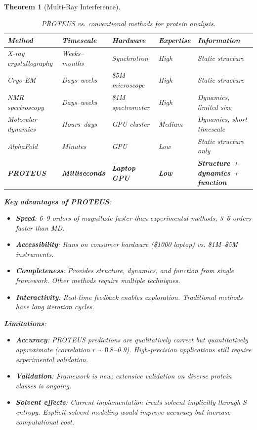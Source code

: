\documentclass[11pt,a4paper]{article}
\newtheorem{theorem}{Theorem}[section]
\begin{document}
\begin{theorem}[Multi-Ray Interference]
\begin{table}[H]
\centering
\caption{PROTEUS vs. conventional methods for protein analysis.}
\small
\begin{tabular}{p{3cm}p{2.5cm}p{2.5cm}p{2.5cm}p{2.5cm}}
\hline
\textbf{Method} & \textbf{Timescale} & \textbf{Hardware} & \textbf{Expertise} & \textbf{Information} \\
\hline
X-ray crystallography & Weeks--months & Synchrotron & High & Static structure \\
Cryo-EM & Days--weeks & \$5M microscope & High & Static structure \\
NMR spectroscopy & Days--weeks & \$1M spectrometer & High & Dynamics, limited size \\
Molecular dynamics & Hours--days & GPU cluster & Medium & Dynamics, short timescale \\
AlphaFold & Minutes & GPU & Low & Static structure only \\
\textbf{PROTEUS} & \textbf{Milliseconds} & \textbf{Laptop GPU} & \textbf{Low} & \textbf{Structure + dynamics + function} \\
\hline
\end{tabular}
\end{table}

\textbf{Key advantages of PROTEUS}:
\begin{itemize}
\item \textbf{Speed}: 6--9 orders of magnitude faster than experimental methods, 3--6 orders faster than MD.
\item \textbf{Accessibility}: Runs on consumer hardware (\$1000 laptop) vs. \$1M--\$5M instruments.
\item \textbf{Completeness}: Provides structure, dynamics, and function from single framework. Other methods require multiple techniques.
\item \textbf{Interactivity}: Real-time feedback enables exploration. Traditional methods have long iteration cycles.
\end{itemize}

\textbf{Limitations}:
\begin{itemize}
\item \textbf{Accuracy}: PROTEUS predictions are qualitatively correct but quantitatively approximate (correlation $r \sim 0.8$--0.9). High-precision applications still require experimental validation.
\item \textbf{Validation}: Framework is new; extensive validation on diverse protein classes is ongoing.
\item \textbf{Solvent effects}: Current implementation treats solvent implicitly through S-entropy. Explicit solvent modeling would improve accuracy but increase computational cost.
\end{itemize}


\end{theorem}
\end{document}
